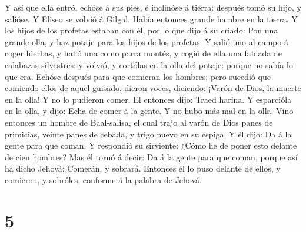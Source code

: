  Y así que ella entró, echóse á sus pies, é inclinóse á
tierra: después tomó su hijo, y salióse.  Y Eliseo se
volvió á Gilgal. Había entonces grande hambre en la tierra. Y los hijos
de los profetas estaban con él, por lo que dijo á su criado: Pon una
grande olla, y haz potaje para los hijos de los profetas. 
Y salió uno al campo á coger hierbas, y halló una como parra montés, y
cogió de ella una faldada de calabazas silvestres: y volvió, y cortólas
en la olla del potaje: porque no sabía lo que era.  Echóse
después para que comieran los hombres; pero sucedió que comiendo ellos
de aquel guisado, dieron voces, diciendo: ¡Varón de Dios, la muerte en
la olla! Y no lo pudieron comer.  El entonces dijo: Traed
harina. Y esparcióla en la olla, y dijo: Echa de comer á la gente. Y no
hubo más mal en la olla.  Vino entonces un hombre de
Baal-salisa, el cual trajo al varón de Dios panes de primicias, veinte
panes de cebada, y trigo nuevo en su espiga. Y él dijo: Da á la gente
para que coman.  Y respondió su sirviente: ¿Cómo he de
poner esto delante de cien hombres? Mas él tornó á decir: Da á la gente
para que coman, porque así ha dicho Jehová: Comerán, y sobrará.
 Entonces él lo puso delante de ellos, y comieron, y
sobróles, conforme á la palabra de Jehová.

\hypertarget{section-4}{%
\section{5}\label{section-4}}


